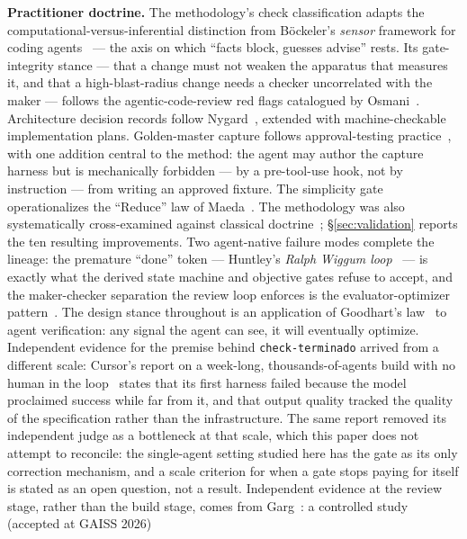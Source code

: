 \documentclass[11pt]{article}
\begin{document}
\textbf{Practitioner doctrine.} The methodology's check classification adapts
the computational-versus-inferential distinction from B\"ockeler's
\emph{sensor} framework for coding agents~\cite{boeckeler2025sensors,fowler2023exploring}
--- the axis on which ``facts block, guesses advise'' rests. Its gate-integrity
stance --- that a change must not weaken the apparatus that measures it, and
that a high-blast-radius change needs a checker uncorrelated with the maker ---
follows the agentic-code-review red flags catalogued by Osmani~\cite{osmani2025agentic}.
Architecture decision records follow Nygard~\cite{nygard2011adr}, extended with
machine-checkable implementation plans. Golden-master capture follows
approval-testing practice~\cite{approvaltests}, with one addition central to the
method: the agent may author the capture harness but is mechanically forbidden
--- by a pre-tool-use hook, not by instruction --- from writing an approved
fixture. The simplicity gate operationalizes the ``Reduce'' law of
Maeda~\cite{maeda2006simplicity}. The methodology was also systematically
cross-examined against classical
doctrine~\cite{thomas2019pragmatic}; \S\ref{sec:validation} reports the ten
resulting improvements. Two agent-native failure modes complete the lineage:
the premature ``done'' token --- Huntley's \emph{Ralph Wiggum
loop}~\cite{huntley2025ralph} --- is exactly what the derived state machine and
objective gates refuse to accept, and the maker-checker separation the review
loop enforces is the evaluator-optimizer pattern~\cite{anthropic2024agents}.
The design stance throughout is an application of Goodhart's
law~\cite{strathern1997improving} to agent verification: any signal the agent
can see, it will eventually optimize.
Independent evidence for the premise behind \texttt{check-terminado} arrived from
a different scale: Cursor's report on a week-long, thousands-of-agents build with
no human in the loop~\cite{lin2026selfdriving} states that its first harness
failed because the model proclaimed success while far from it, and that output
quality tracked the quality of the specification rather than the
infrastructure. The same report removed its independent judge as a bottleneck
at that scale, which this paper does not attempt to reconcile: the single-agent
setting studied here has the gate as its only correction mechanism, and a
scale criterion for when a gate stops paying for itself is stated as an open
question, not a result.
Independent evidence at the review stage, rather than the build stage, comes
from Garg~\cite{garg2026spec}: a controlled study (accepted at GAISS 2026)
\end{document}
